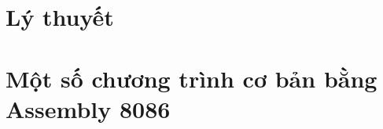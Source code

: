\documentclass[12pt]{report}
\begin{document}
\renewcommand*\contentsname{Mục lục}
\setcounter{tocdepth}{2}
\tableofcontents
\pagebreak

\chapter{Lý thuyết} \label{chapterLyThuyet}
\pagebreak









\chapter{Một số chương trình cơ bản bằng Assembly 8086} \label{chapterBaiTap}



\renewcommand{\bibname}{Tài liệu tham khảo}


\end{document}
